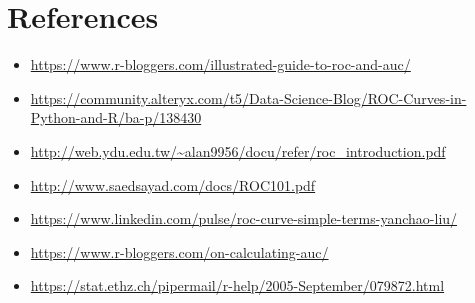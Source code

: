 \documentclass[]{article}
\providecommand{\tightlist}{%
  \setlength{\itemsep}{0pt}\setlength{\parskip}{0pt}}
\begin{document}
\section{References}\label{references}

\begin{itemize}
\tightlist
\item
  \url{https://www.r-bloggers.com/illustrated-guide-to-roc-and-auc/}
\item
  \url{https://community.alteryx.com/t5/Data-Science-Blog/ROC-Curves-in-Python-and-R/ba-p/138430}
\item
  \url{http://web.ydu.edu.tw/~alan9956/docu/refer/roc_introduction.pdf}
\item
  \url{http://www.saedsayad.com/docs/ROC101.pdf}
\item
  \url{https://www.linkedin.com/pulse/roc-curve-simple-terms-yanchao-liu/}
\item
  \url{https://www.r-bloggers.com/on-calculating-auc/}
\item
  \url{https://stat.ethz.ch/pipermail/r-help/2005-September/079872.html}
\end{itemize}
\end{document}

